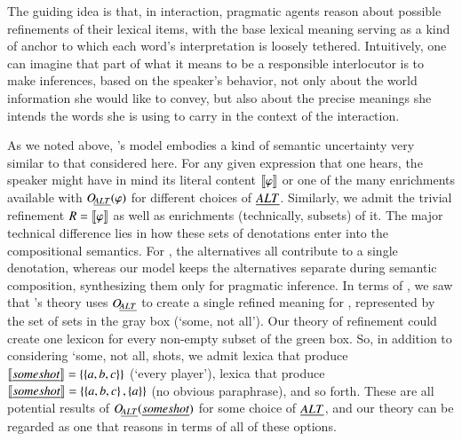 \documentclass[leqno,12pt]{article}
\begin{document}

The guiding idea is that, in interaction, pragmatic agents reason
about possible refinements of their lexical items, with the base
lexical meaning serving as a kind of anchor to which each word's
interpretation is loosely tethered.  Intuitively, one can imagine that
part of what it means to be a responsible interlocutor is to make
inferences, based on the speaker's behavior, not only about the world
information she would like to convey, but also about the precise
meanings she intends the words she is using to carry in the context of
the interaction.


As we noted above, \CFS's model embodies a kind of semantic
uncertainty very similar to that considered here. For any given
expression that one hears, the speaker might have in mind its literal
content $\llbracket\varphi\rrbracket$ or one of the many enrichments available with
$\mathop{O\negthinspace_{\emph{ALT}}}(\varphi)$ for different choices of $\emph{ALT}$. Similarly, we admit
the trivial refinement $R = \llbracket\varphi\rrbracket$ as well as enrichments
(technically, subsets) of it. The major technical difference lies in
how these sets of denotations enter into the compositional
semantics. For \CFS, the alternatives all contribute to a single
denotation, whereas our model keeps the alternatives separate during
semantic composition, synthesizing them only for pragmatic
inference. In terms of , we saw that \CFS's theory
uses $\mathop{O\negthinspace_{\emph{ALT}}}$ to create a single refined meaning for ,
represented by the set of sets in the gray box (`some, not all'). Our
theory of refinement could create one lexicon for every non-empty
subset of the green box. So, in addition to considering `some, not
all, shots, we admit lexica that produce
$\llbracket\emph{some shot}\rrbracket = \left\{ \left\{ a,b,c \right\} \right\}$ (`every player'), lexica
that produce $\llbracket\emph{some shot}\rrbracket = \left\{ \left\{ a,b,c \right\},\left\{ a \right\} \right\}$
(no obvious paraphrase), and so forth. These are all potential results
of $\mathop{O\negthinspace_{\emph{ALT}}}(\emph{some shot})$ for some choice of $\emph{ALT}$, and our theory
can be regarded as one that reasons in terms of all of these options.
\end{document}
